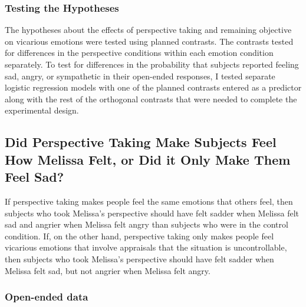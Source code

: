 \documentclass[man,a4paper,noextraspace,apacite]{apa6}\usepackage[]{graphicx}\usepackage[]{color}
\begin{document}
\subsubsection{Testing the Hypotheses} The hypotheses about the effects of perspective taking and remaining objective on vicarious emotions were tested using planned contrasts. The contrasts tested for differences in the perspective conditions within each emotion condition separately. To test for differences in the probability that subjects reported feeling sad, angry, or sympathetic in their open-ended responses, I tested separate logistic regression models with one of the planned contrasts entered as a predictor along with the rest of the orthogonal contrasts that were needed to complete the experimental design. 


\subsection{Did Perspective Taking Make Subjects Feel How Melissa Felt, or Did it Only Make Them Feel Sad?}

If perspective taking makes people feel the same emotions that others feel, then subjects who took Melissa's perspective should have felt sadder when Melissa felt sad and angrier when Melissa felt angry than subjects who were in the control condition. If, on the other hand, perspective taking only makes people feel vicarious emotions that involve appraisals that the situation is uncontrollable, then subjects who took Melissa's perspective should have felt sadder when Melissa felt sad, but not angrier when Melissa felt angry.

\subsubsection{Open-ended data}
\end{document}
